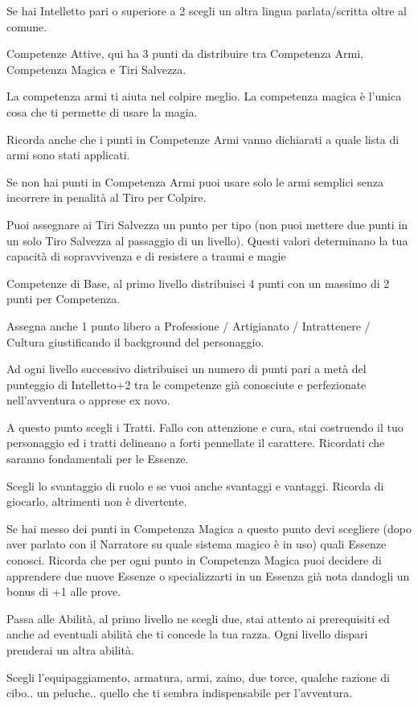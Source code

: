 \documentclass[a4paper,11pt,twoside,openany]{book}
\begin{document}
Se hai Intelletto pari o superiore a 2 scegli un altra lingua parlata/scritta oltre al comune.

Competenze Attive, qui ha 3 punti da distribuire tra Competenza Armi, Competenza Magica e Tiri Salvezza.

La competenza armi ti aiuta nel colpire meglio. La competenza magica è l'unica cosa che ti permette di usare la magia.

Ricorda anche che i punti in Competenze Armi vanno dichiarati a quale lista di armi sono stati applicati.

Se non hai punti in Competenza Armi puoi usare solo le armi semplici senza incorrere in penalità al Tiro per Colpire.

Puoi assegnare ai Tiri Salvezza un punto per tipo (non puoi mettere due punti in un solo Tiro Salvezza al passaggio di un livello). Questi valori determinano la tua capacità di sopravvivenza e di resistere a traumi e magie

Competenze di Base, al primo livello distribuisci 4 punti con un massimo di 2 punti per Competenza.

Assegna anche 1 punto libero a Professione / Artigianato / Intrattenere / Cultura giustificando il background del personaggio.

Ad ogni livello successivo distribuisci un numero di punti pari a metà del punteggio di Intelletto+2 tra le competenze già conosciute e perfezionate nell'avventura o apprese ex novo.

A questo punto scegli i Tratti. Fallo con attenzione e cura, stai costruendo il tuo personaggio ed i tratti delineano a forti pennellate il carattere. Ricordati che saranno fondamentali per le Essenze.

Scegli lo svantaggio di ruolo e se vuoi anche svantaggi e vantaggi. Ricorda di giocarlo, altrimenti non è divertente.

Se hai messo dei punti in Competenza Magica a questo punto devi scegliere (dopo aver parlato con il Narratore su quale sistema magico è in uso) quali Essenze conosci. Ricorda che per ogni punto in Competenza Magica puoi decidere di apprendere due nuove Essenze o specializzarti in un Essenza già nota dandogli un bonus di +1 alle prove.

Passa alle Abilità, al primo livello ne scegli due, stai attento ai prerequisiti ed anche ad eventuali abilità che ti concede la tua razza. Ogni livello dispari prenderai un altra abilità.

Scegli l'equipaggiamento, armatura, armi, zaino, due torce, qualche razione di cibo.. un peluche.. quello che ti sembra indispensabile per l'avventura.
\end{document}

